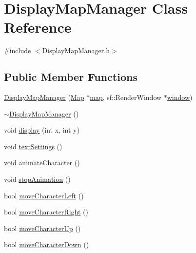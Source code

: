 \hypertarget{class_display_map_manager}{}\section{Display\+Map\+Manager Class Reference}
\label{class_display_map_manager}


{\ttfamily \#include $<$Display\+Map\+Manager.\+h$>$}

\subsection*{Public Member Functions}
\begin{DoxyCompactItemize}
\item 
\hyperlink{class_display_map_manager_acca16727ef15d478af88df1acb8a1c89}{Display\+Map\+Manager} (\hyperlink{class_map}{Map} $\ast$\hyperlink{class_display_map_manager_aefa663d75781e47edfc5629e3652ead8}{map}, sf\+::\+Render\+Window $\ast$\hyperlink{class_display_map_manager_a880f01a1287f35cc4852c2e5d58ecd24}{window})
\item 
\hyperlink{class_display_map_manager_a9bce4856c4b749ce83a477d1801d1599}{$\sim$\+Display\+Map\+Manager} ()
\item 
void \hyperlink{class_display_map_manager_abd434e3d2795be7f9421f8bfe694d934}{display} (int x, int y)
\item 
void \hyperlink{class_display_map_manager_aff8cc85b9a149514ae95608ddbe20e10}{text\+Settings} ()
\item 
void \hyperlink{class_display_map_manager_a74e361f45d1e8366cbb1c0bba8ba7d0b}{animate\+Character} ()
\item 
void \hyperlink{class_display_map_manager_a9b8270c9ea4c4f5f036248719b4eae7c}{stop\+Animation} ()
\item 
bool \hyperlink{class_display_map_manager_af7e12870120f25befe945d54fe452288}{move\+Character\+Left} ()
\item 
bool \hyperlink{class_display_map_manager_ad17768ba9192593d2f0e6c8dad853899}{move\+Character\+Right} ()
\item 
bool \hyperlink{class_display_map_manager_ab1ed4f96b21f662039d3a96bafd75ca2}{move\+Character\+Up} ()
\item 
bool \hyperlink{class_display_map_manager_a9d19cecb4e669680321fef6d3e85910c}{move\+Character\+Down} ()
\end{DoxyCompactItemize}
